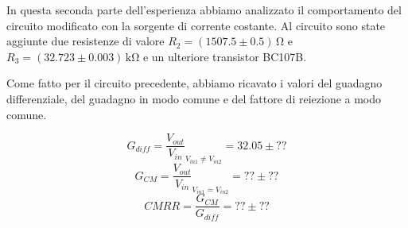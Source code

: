 In questa seconda parte dell'esperienza abbiamo analizzato il comportamento del circuito modificato con la sorgente di corrente costante.
Al circuito sono state aggiunte due resistenze di valore $R_2 = (1507.5 \pm 0.5)\,\si{\ohm}$ e $R_3 = (32.723 \pm 0.003)\,\si{\kilo\ohm}$ e un ulteriore transistor BC107B.

Come fatto per il circuito precedente, abbiamo ricavato i valori del guadagno differenziale, del guadagno in modo comune e del fattore di reiezione a modo comune.

\begin{equation}
	G_{diff} = \frac{V_{out}}{V_{in}} _{V_{in1} \neq V_{in2}} = 32.05 \pm ??
\end{equation}
\begin{equation}
	G_{CM} = \frac{V_{out}}{V_{in}} _{V_{in1} = V_{in2}} = ?? \pm ??
\end{equation}
\begin{equation}
	CMRR = \frac{G_{CM}}{G_{diff}} = ?? \pm ??
\end{equation}